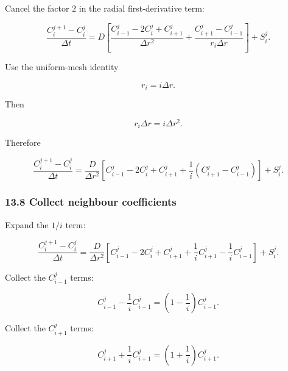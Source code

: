 \documentclass[11pt,a4paper]{article}
\begin{document}
Cancel the factor $2$ in the radial first-derivative term:

\begin{equation}
\frac{
C_i^{j+1}-C_i^j
}{
\Delta t
}
=
D
\left[
\frac{
C_{i-1}^j-2C_i^j+C_{i+1}^j
}{
\Delta r^2
}
+
\frac{
C_{i+1}^j-C_{i-1}^j
}{
r_i\Delta r
}
\right]
+
S_i^j.
\tag{TRISO-DIS-130}
\label{eq:triso-dis-130}
\end{equation}

Use the uniform-mesh identity

\begin{equation}
r_i=i\Delta r.
\tag{TRISO-DIS-131}
\label{eq:triso-dis-131}
\end{equation}

Then

\begin{equation}
r_i\Delta r
=
i\Delta r^2.
\tag{TRISO-DIS-132}
\label{eq:triso-dis-132}
\end{equation}

Therefore

\begin{equation}
\frac{
C_i^{j+1}-C_i^j
}{
\Delta t
}
=
\frac{D}{\Delta r^2}
\left[
C_{i-1}^j
-
2C_i^j
+
C_{i+1}^j
+
\frac1i
\left(
C_{i+1}^j-C_{i-1}^j
\right)
\right]
+
S_i^j.
\tag{TRISO-DIS-133}
\label{eq:triso-dis-133}
\end{equation}

\subsubsection*{13.8 Collect neighbour coefficients}

Expand the $1/i$ term:

\begin{equation}
\frac{
C_i^{j+1}-C_i^j
}{
\Delta t
}
=
\frac{D}{\Delta r^2}
\left[
C_{i-1}^j
-
2C_i^j
+
C_{i+1}^j
+
\frac1iC_{i+1}^j
-
\frac1iC_{i-1}^j
\right]
+
S_i^j.
\tag{TRISO-DIS-134}
\label{eq:triso-dis-134}
\end{equation}

Collect the $C_{i-1}^j$ terms:

\begin{equation}
C_{i-1}^j
-
\frac1iC_{i-1}^j
=
\left(
1-\frac1i
\right)
C_{i-1}^j.
\tag{TRISO-DIS-135}
\label{eq:triso-dis-135}
\end{equation}

Collect the $C_{i+1}^j$ terms:

\begin{equation}
C_{i+1}^j
+
\frac1iC_{i+1}^j
=
\left(
1+\frac1i
\right)
C_{i+1}^j.
\tag{TRISO-DIS-136}
\label{eq:triso-dis-136}
\end{equation}
\end{document}
